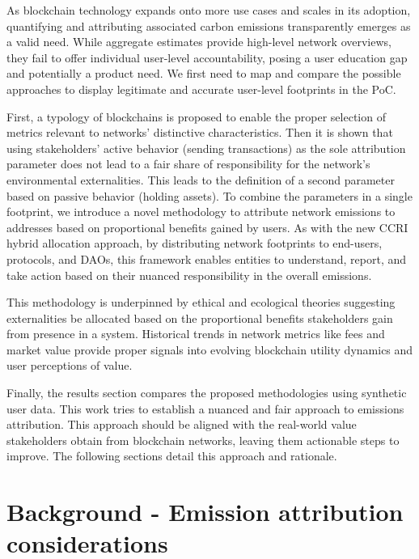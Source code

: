 \documentclass[11pt]{report}
\begin{document}

As blockchain technology expands onto more use cases and scales in its adoption, quantifying and attributing associated carbon emissions transparently emerges as a valid need. While aggregate estimates provide high-level network overviews, they fail to offer individual user-level accountability, posing a user education gap and potentially a product need. We first need to map and compare the possible approaches to display legitimate and accurate user-level footprints in the PoC.

First, a typology of blockchains is proposed to enable the proper selection of metrics relevant to networks' distinctive characteristics. Then it is shown that using stakeholders' active behavior (sending transactions) as the sole attribution parameter does not lead to a fair share of responsibility for the network's environmental externalities. This leads to the definition of a second parameter based on passive behavior (holding assets). To combine the parameters in a single footprint, we introduce a novel methodology to attribute network emissions to addresses based on proportional benefits gained by users. As with the new \ac{CCRI} hybrid allocation approach, by distributing network footprints to end-users, protocols, and DAOs, this framework enables entities to understand, report, and take action based on their nuanced responsibility in the overall emissions.

This methodology is underpinned by ethical and ecological theories suggesting externalities be allocated based on the proportional benefits stakeholders gain from presence in a system. Historical trends in network metrics like fees and market value provide proper signals into evolving blockchain utility dynamics and user perceptions of value.

Finally, the results section compares the proposed methodologies using synthetic user data. This work tries to establish a nuanced and fair approach to emissions attribution. This approach should be aligned with the real-world value stakeholders obtain from blockchain networks, leaving them actionable steps to improve. The following sections detail this approach and rationale.

\section{Background - Emission attribution considerations}
\end{document}
